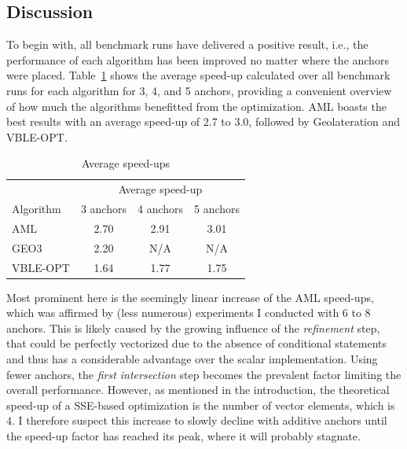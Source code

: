\subsection{Discussion}
To begin with, all benchmark runs have delivered a positive result, i.e., the performance of each algorithm has been improved no matter where the anchors were placed. Table~\ref{average_table} shows the average speed-up calculated over all benchmark runs for each algorithm for 3, 4, and 5 anchors, providing a convenient overview of how much the algorithms benefitted from the optimization. AML boasts the best results with an average speed-up of 2.7 to 3.0, followed by Geolateration and VBLE-OPT.

\begin{table}[ht]
\begin{center}
\begin{tabular}{lccc} 
\toprule
& \multicolumn{3}{c}{Average speed-up} \\ 
\cmidrule(r){2-4}
Algorithm & 3 anchors & 4 anchors & 5 anchors \\
\midrule
AML & 2.70 & 2.91 & 3.01 \\
GEO3 & 2.20 & N/A & N/A \\ 
VBLE-OPT & 1.64 & 1.77& 1.75 \\
\bottomrule
\end{tabular}
\caption{Average speed-ups}
\label{average_table}
\end{center}
\end{table}

Most prominent here is the seemingly linear increase of the AML speed-ups, which was affirmed by (less numerous) experiments I conducted with 6 to 8 anchors. This is likely caused by the growing influence of the \emph{refinement} step, that could be perfectly vectorized due to the absence of conditional statements and thus has a considerable advantage over the scalar implementation. Using fewer anchors, the \emph{first intersection} step becomes the prevalent factor limiting the overall performance. However, as mentioned in the introduction, the theoretical speed-up of a SSE-based optimization is the number of vector elements, which is 4. I therefore suspect this increase to slowly decline with additive anchors until the speed-up factor has reached its peak, where it will probably stagnate.

